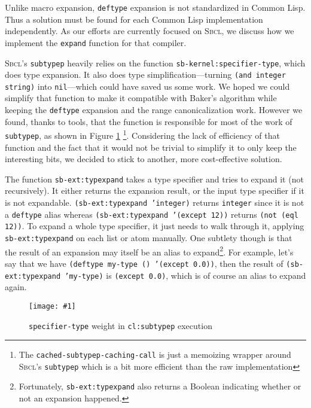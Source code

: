 \documentclass[format=sigconf]{acmart}
\newcommand\code[2][\small]{\sloppy\texttt{#1#2}}
\newcommand\footcode[1]{\code[\scriptsize]{#1}}
\theoremstyle{definition}
\newcommand\sbcl{\textsc{Sbcl}}
\begin{document}
Unlike macro expansion, \code{deftype} expansion is not standardized in Common
Lisp. Thus a solution must be found for each Common Lisp implementation
independently. As our efforts are currently focused on \sbcl{}, we discuss
how we implement the \code{expand} function for that compiler.

\sbcl's \code{subtypep} heavily relies on the function
\code{sb-kernel:specifier-type}, which does type expansion. It also does
type simplification---turning \code{(and integer string)} into
\code{nil}---which could have saved us some work. We hoped we could simplify
that function to make it compatible with Baker's algorithm while keeping the
\code{deftype} expansion and the range canonicalization work. However we found,
thanks to \cite{newton.18.phd} tools, that the function is responsible for most
of the work of \code{subtypep}, as shown in Figure \ref{fig:specifiertype}
\footnote{The \footcode{cached-subtypep-caching-call} is just a memoizing wrapper
  around \sbcl's \footcode{subtypep} which is a bit more efficient than the raw
  implementation}.
Considering the lack of efficiency of that function and the fact that it would
not be trivial to simplify it to only keep the interesting bits, we decided to
stick to another, more cost-effective solution.

The function \code{sb-ext:typexpand} takes a type specifier and tries to expand
it (not recursively). It either returns the expansion result, or the input type
specifier if it is not expandable. \code{(sb-ext:typexpand 'integer)} returns
\code{integer} since it is not a \code{deftype} alias whereas
\code{(sb-ext:typexpand '(except 12))} returns \code{(not (eql 12))}.
To expand a whole type specifier, it just needs to walk through it, applying
\code{sb-ext:typexpand} on each list or atom manually. One subtlety though is
that the result of an expansion may itself be an alias to
expand\footnote{%
  Fortunately, \footcode{sb-ext:typexpand} also returns a Boolean indicating
  whether or not an expansion happened.%
}. For example, let's say that we have
\code{(deftype my-type () '(except 0.0))}, then the result of
\code{(sb-ext:typexpand 'my-type)} is \code{(except 0.0)}, which is of course an
alias to expand again.

\begin{figure}
  \centering
  \newcommand\profgraph[1]{\texttt{[image: \#1]}}
  \profgraph{assets/19/stGTstp}
  \caption{\code{specifier-type} weight in \code{cl:subtypep} execution}
  \label{fig:specifiertype}
\end{figure}
\end{document}
